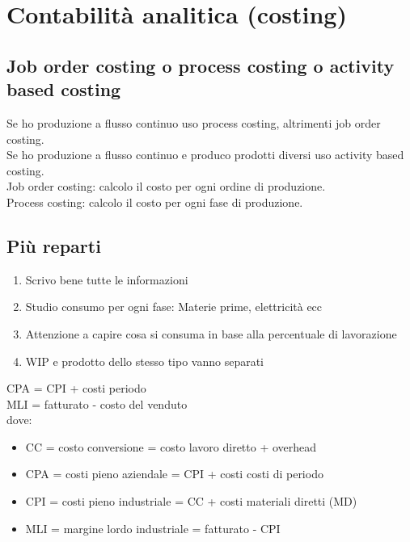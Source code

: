 \documentclass{scrreprt}
\begin{document}
\section*{Contabilità analitica (costing)}

\subsection*{Job order costing o process costing o activity based costing}
Se ho produzione a flusso continuo uso process costing, altrimenti job order costing.\\
Se ho produzione a flusso continuo e produco prodotti diversi uso activity based costing.\\
Job order costing: calcolo il costo per ogni ordine di produzione.\\
Process costing: calcolo il costo per ogni fase di produzione.

\subsection*{Più reparti}
\begin{enumerate}
	\item Scrivo bene tutte le informazioni
	\item Studio consumo per ogni fase: Materie prime, elettricità ecc
	\item Attenzione a capire cosa si consuma in base alla percentuale di lavorazione
	\item WIP e prodotto dello stesso tipo vanno separati
\end{enumerate}
CPA = CPI + costi periodo\\
MLI = fatturato - costo del venduto\\
dove:
\begin{itemize}
	\item CC = costo conversione = costo lavoro diretto + overhead
	\item CPA = costi pieno aziendale = CPI + costi costi di periodo
	\item CPI = costi pieno industriale = CC + costi materiali diretti (MD)
	\item MLI = margine lordo industriale = fatturato - CPI
\end{itemize}
\end{document}
